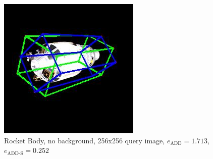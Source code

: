 \begin{figure}[h]
\begin{minipage}{0.45\linewidth}
        \includegraphics[width=\linewidth]{data/fig6.jpg} %
        \caption{Rocket Body, no background, 256x256 query image, $e_\mathrm{ADD}=1.713$, $e_{\mathrm{ADD}\text{-}\mathrm{S}}=0.252$ }
        \label{fig:image2}
    \end{minipage}
\end{figure}

